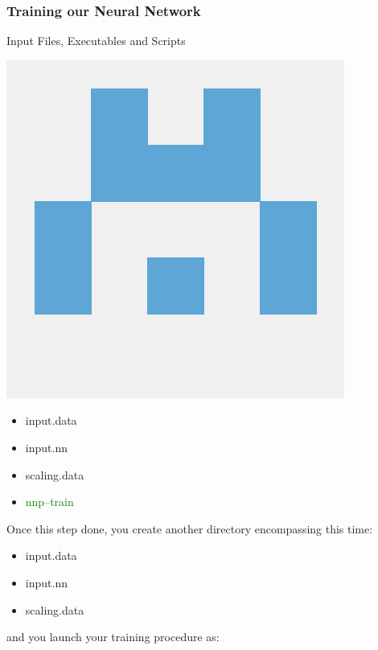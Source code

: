 \documentclass[12pt]{article}
\begin{document}
\subsubsection{Training our Neural Network}
\begin{mybox2}{{Input Files, Executables and Scripts}}
\begin{minipage}[c]{0.5\linewidth}
\includegraphics[scale=0.1]{n2p2.png}
\end{minipage}
\begin{minipage}[c]{0.5\linewidth}
\begin{itemize}
    \item input.data
    \item input.nn
    \item scaling.data
    \item \textcolor{green}{nnp--train}
\end{itemize}
\end{minipage}
\end{mybox2}
Once this step done, you create another directory encompassing this time:
\begin{itemize}
    \item input.data
    \item input.nn
    \item scaling.data
\end{itemize}
and you launch your training procedure as:
\begin{center}
\end{center}
\end{document}
